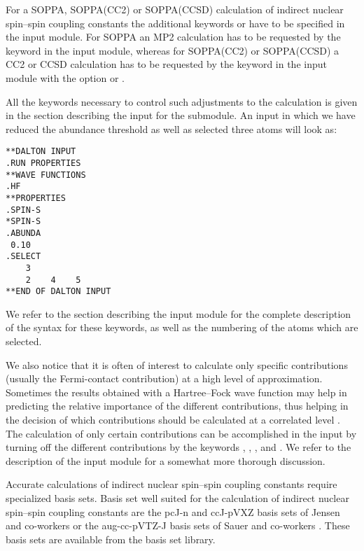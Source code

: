 For a SOPPA, SOPPA(CC2) or
SOPPA(CCSD) calculation of indirect nuclear
spin--spin coupling constants the additional keywords  or
 have to be specified in the  input
module. For SOPPA an MP2 calculation has to be requested by the keyword
 in the  input module, whereas for
SOPPA(CC2) or SOPPA(CCSD) a CC2 or CCSD calculation has to be requested
by the keyword  in the  input module with the  option
 or .

All the keywords necessary to control such adjustments to the
calculation is given in the section describing the input for the
 submodule. An input in which we  have reduced the
abundance threshold as well as selected three atoms will look as:

\begin{verbatim}
**DALTON INPUT
.RUN PROPERTIES
**WAVE FUNCTIONS
.HF
**PROPERTIES
.SPIN-S
*SPIN-S
.ABUNDA
 0.10
.SELECT
    3
    2    4    5
**END OF DALTON INPUT
\end{verbatim}

We refer to the section describing the  input module for
the complete description of the syntax for these keywords, as well as
the numbering of the atoms which are selected.

We also notice that it is often of interest to calculate only specific
contributions (usually the Fermi-contact contribution) at a high level
of approximation. Sometimes the results obtained with a Hartree--Fock
wave function may help in predicting the relative importance of the different
contributions, thus helping in the decision of which contributions
should be calculated at a correlated level \cite{krthklbpjcpl226}.
The calculation of only certain contributions can be accomplished in
the input by turning off the different
contributions by the keywords , ,
, and . We refer to the description of the
 input module for a somewhat more thorough discussion.

Accurate calculations of indirect nuclear spin--spin coupling constants
require specialized basis sets. Basis set well suited for the
calculation of indirect nuclear spin--spin coupling constants are the
pcJ-n and ccJ-pVXZ basis sets of Jensen and co-workers
\cite{nmr06-jctc2-1360,bs10-tca126-371,nmr08-jcp129-064111}  or the
aug-cc-pVTZ-J basis sets of Sauer and co-workers
\cite{tejospastcan100,pfpgaaspasjcp115,spas058,spas091,spas096}. These
basis sets are available from the basis set library.


